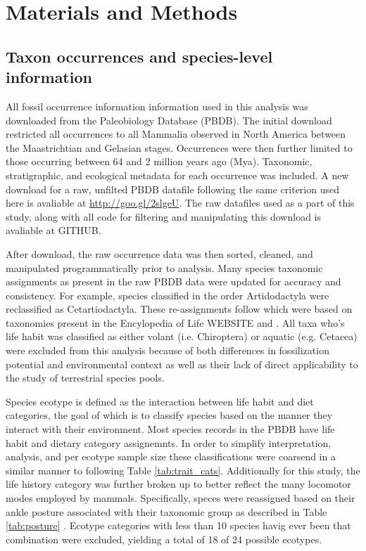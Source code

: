 \documentclass[12pt,letterpaper]{article}
\begin{document}
\section*{Materials and Methods}

\subsection*{Taxon occurrences and species-level information}
All fossil occurrence information information used in this analysis was downloaded from the Paleobiology Database (PBDB). The initial download restricted all occurrences to all Mammalia observed in North America between the Maastrichtian and Gelasian stages. Occurrences were then further limited to those occurring between 64 and 2 million years ago (Mya). Taxonomic, stratigraphic, and ecological metadata for each occurrence was included. A new download for a raw, unfilted PBDB datafile following the same criterion used here is avaliable at \url{http://goo.gl/2slgeU}. The raw datafiles used as a part of this study, along with all code for filtering and manipulating this download is avaliable at GITHUB.

After download, the raw occurrence data was then sorted, cleaned, and manipulated programmatically prior to analysis. Many species taxonomic assignments as present in the raw PBDB data were updated for accuracy and consistency. For example, species classified in the order Artidodactyla were reclassified as Cetartiodactyla. These re-assignments follow \citet{Smits2015b} which were based on taxonomies present in the Encylopedia of Life WEBSITE and \citet{Janis1998,Janis2008}. All taxa who's life habit was classified as either volant (i.e. Chiroptera) or aquatic (e.g. Cetacea) were excluded from this analysis because of both differences in fossilization potential and environmental context as well as their lack of direct applicability to the study of terrestrial species pools.

Species ecotype is defined as the interaction between life habit and diet categories, the goal of which is to classify species based on the manner they interact with their environment. Most species records in the PBDB have life habit and dietary category assignemnts. In order to simplify interpretation, analysis, and per ecotype sample size these classifications were coarsend in a similar manner to \citep{Smits2015b} following Table \ref{tab:trait_cats}. Additionally for this study, the life history category was further broken up to better reflect the many locomotor modes employed by mammals. Specifically, speces were reassigned based on their ankle posture associated with their taxonomic group as described in Table \ref{tab:posture} \citep{Carrano1999}. Ecotype categories with less than 10 species havig ever been that combination were excluded, yielding a total of 18 of 24 possible ecotypes. %
\end{document}
